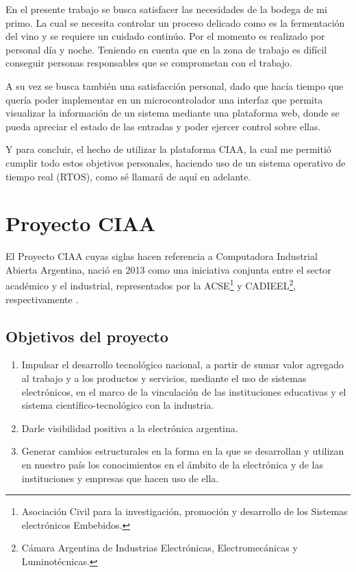 \begin{description}
En el presente trabajo se busca satisfacer las necesidades de la bodega de mi primo. La cual se necesita controlar un proceso delicado como es la fermentación del vino y se requiere un cuidado continúo. Por el momento es realizado por personal día y noche. Teniendo en cuenta que en la zona de trabajo es difícil conseguir personas responsables que se comprometan con el trabajo. 

A su vez se busca también una satisfacción personal, dado que hacía tiempo que quería poder implementar en un microcontrolador una interfaz que permita visualizar la información de un sistema mediante una plataforma web, donde se pueda apreciar el estado de las entradas y poder ejercer control sobre ellas.

Y para concluir, el hecho de utilizar la plataforma CIAA, la cual me permitió cumplir todo estos objetivos personales, haciendo uso de un sistema operativo de tiempo real (RTOS), como sé llamará de aquí en adelante.



\section{Proyecto CIAA}

El Proyecto CIAA cuyas siglas hacen referencia a Computadora Industrial Abierta Argentina, nació en 2013 como una iniciativa conjunta entre el sector académico y el industrial, representados por la ACSE\footnote{Asociación Civil para la investigación, promoción y desarrollo de los Sistemas electrónicos Embebidos.} y CADIEEL\footnote{Cámara Argentina de Industrias Electrónicas, Electromecánicas y Luminotécnicas.}, respectivamente \citep{CIAA}.

\subsection{Objetivos del proyecto}
\begin{enumerate}
  \item Impulsar el desarrollo tecnológico nacional, a partir de sumar valor agregado al trabajo y a los productos y servicios, mediante el uso de sistemas electrónicos, en el marco de la vinculación de las instituciones educativas y el sistema científico-tecnológico con la industria.
  \item Darle visibilidad positiva a la electrónica argentina.
  \item Generar cambios estructurales en la forma en la que se desarrollan y utilizan en nuestro país los conocimientos en el ámbito de la electrónica y de las instituciones y empresas que hacen uso de ella.
\end{enumerate}


\end{description}
